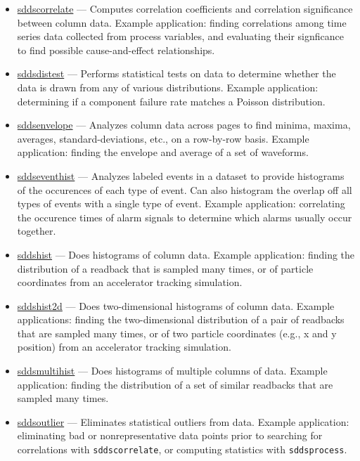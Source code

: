 \documentclass[11pt]{article}
\newcommand{\progref}[1]{\hyperref[#1]{#1}}
\begin{document}
\begin{itemize}

\item \progref{sddscorrelate} --- Computes correlation coefficients and
correlation significance between column data.  Example application: finding correlations among time series data
collected from process variables, and evaluating their signficance to find possible cause-and-effect relationships.

\item \progref{sddsdistest} --- Performs statistical tests on data to
determine whether the data is drawn from any of various distributions.
Example application: determining if a component failure rate matches a
Poisson distribution.

\item \progref{sddsenvelope} --- Analyzes column data across pages to find
minima, maxima, averages, standard-deviations, etc., on a row-by-row basis.   Example application: finding 
the envelope and average of a set of waveforms.

\item \progref{sddseventhist} --- Analyzes labeled events in a dataset
to provide histograms of the occurences of each type of event.  Can
also histogram the overlap off all types of events with a single type
of event.  Example application: correlating the occurence times of
alarm signals to determine which alarms usually occur together.

\item \progref{sddshist} --- Does histograms of column data.  Example application: finding the distribution of a
readback that is sampled many times, or of particle coordinates from an accelerator tracking simulation.

\item \progref{sddshist2d} --- Does two-dimensional histograms of column data.  Example applications: finding the
two-dimensional distribution of a pair of readbacks that are sampled many times, or of two particle coordinates
(e.g., x and y position) from an accelerator tracking simulation.

\item \progref{sddsmultihist} --- Does histograms of multiple columns
of data.  Example application: finding the distribution of a set of
similar readbacks that are sampled many times.

\item \progref{sddsoutlier} --- Eliminates statistical outliers from data.  Example application: eliminating bad
or nonrepresentative data points prior to searching for correlations with \verb|sddscorrelate|, or computing
statistics with \verb|sddsprocess|.


\end{itemize}
\end{document}

